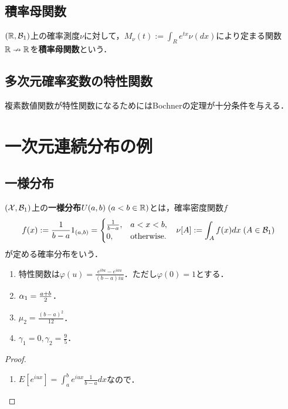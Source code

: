 \documentclass[uplatex,dvipdfmx]{jsreport}
\begin{document}
\subsection{積率母関数}

\begin{definition}
    $(\mathbb{R},\mathcal{B}_1)$上の確率測度$\nu$に対して，$M_\nu(t):=\int_R e^{tx}\nu(dx)$により定まる関数$\mathbb{R}\nrightarrow\mathbb{R}$を\textbf{積率母関数}という．
\end{definition}

\subsection{多次元確率変数の特性関数}

\begin{tcolorbox}[colframe=ForestGreen, colback=ForestGreen!10!white,breakable,colbacktitle=ForestGreen!40!white,coltitle=black,fonttitle=\bfseries\sffamily,
title=]
    複素数値関数が特性関数になるためにはBochnerの定理が十分条件を与える．
\end{tcolorbox}

\section{一次元連続分布の例}

\subsection{一様分布}

\begin{definition}
    $(\mathcal{X},\mathcal{B}_1)$上の\textbf{一様分布}$U(a,b)\;(a<b\in\mathbb{R})$とは，確率密度関数$f$
    \begin{align*}
        f(x)&:=\frac{1}{b-a}1_{(a,b)}=\begin{cases}
            \frac{1}{b-a},&a<x<b,\\
            0,&\mathrm{otherwise}.
        \end{cases}&\nu[A]&:=\int_Af(x)dx\;(A\in\mathcal{B}_1)
    \end{align*}
    が定める確率分布をいう．
\end{definition}

\begin{proposition}\mbox{}
    \begin{enumerate}
        \item 特性関数は$\varphi(u)=\frac{e^{ibu}-e^{iau}}{(b-a)iu}$．ただし$\varphi(0)=1$とする．
        \item $\alpha_1=\frac{a+b}{2}$．
        \item $\mu_2=\frac{(b-a)^2}{12}$．
        \item $\gamma_1=0,\gamma_2=\frac{9}{5}$．
    \end{enumerate}
\end{proposition}
\begin{proof}\mbox{}
    \begin{enumerate}
        \item $E[e^{iux}]=\int^b_ae^{iux}\frac{1}{b-a}dx$なので．
    \end{enumerate}
\end{proof}
\end{document}
